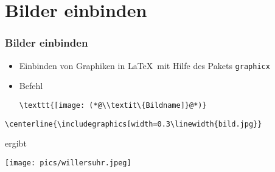 \section{Bilder einbinden}

\begin{frame}[fragile]
  \frametitle{Bilder einbinden}

  \onslide<+->

  \begin{itemize}
  \item Einbinden von Graphiken in \LaTeX\ mit Hilfe des Pakets \texttt{graphicx}
  \item Befehl
\begin{lstlisting}
\texttt{[image: (*@\\textit\{Bildname]}@*)}
\end{lstlisting}
  \end{itemize}

  \onslide<+->

  \begin{Beispiel}
\begin{lstlisting}
\centerline{\includegraphics[width=0.3\linewidth{bild.jpg}}
\end{lstlisting}%

    ergibt

    \centerline{\texttt{[image: pics/willersuhr.jpeg]}} %
  \end{Beispiel}

\end{frame}





